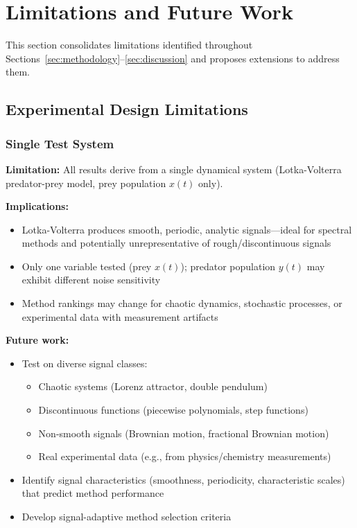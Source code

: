 \section{Limitations and Future Work}
\label{sec:future_work}

This section consolidates limitations identified throughout Sections~\ref{sec:methodology}--\ref{sec:discussion} and proposes extensions to address them.

\subsection{Experimental Design Limitations}
\label{sec:design_limitations}

\subsubsection{Single Test System}

\textbf{Limitation:} All results derive from a single dynamical system (Lotka-Volterra predator-prey model, prey population $x(t)$ only).

\textbf{Implications:}
\begin{itemize}
    \item Lotka-Volterra produces smooth, periodic, analytic signals—ideal for spectral methods and potentially unrepresentative of rough/discontinuous signals
    \item Only one variable tested (prey $x(t)$); predator population $y(t)$ may exhibit different noise sensitivity
    \item Method rankings may change for chaotic dynamics, stochastic processes, or experimental data with measurement artifacts
\end{itemize}

\textbf{Future work:}
\begin{itemize}
    \item Test on diverse signal classes: 
    \begin{itemize}
        \item Chaotic systems (Lorenz attractor, double pendulum)
        \item Discontinuous functions (piecewise polynomials, step functions)
        \item Non-smooth signals (Brownian motion, fractional Brownian motion)
        \item Real experimental data (e.g., from physics/chemistry measurements)
    \end{itemize}
    \item Identify signal characteristics (smoothness, periodicity, characteristic scales) that predict method performance
    \item Develop signal-adaptive method selection criteria
\end{itemize}


